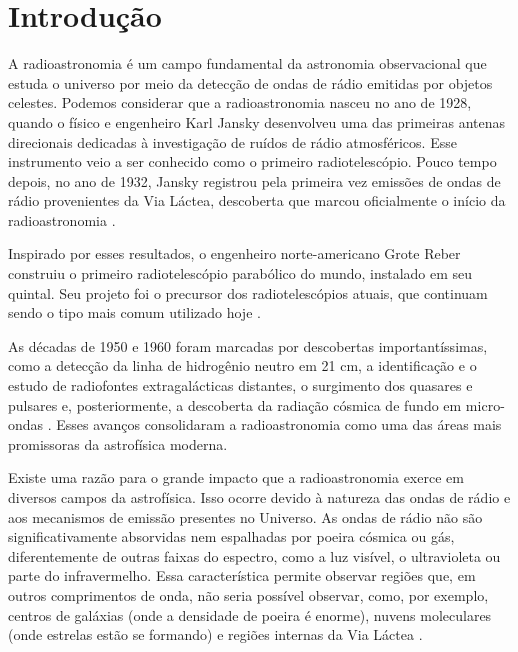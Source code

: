 %
\chapter{Introdução}

A radioastronomia é um campo fundamental da astronomia observacional que estuda o universo por meio da detecção de ondas de rádio emitidas por objetos celestes. Podemos considerar que a radioastronomia nasceu no ano de 1928, quando o físico e engenheiro Karl Jansky desenvolveu uma das primeiras antenas direcionais dedicadas à investigação de ruídos de rádio atmosféricos. Esse instrumento veio a ser conhecido como o primeiro radiotelescópio. Pouco tempo depois, no ano de 1932, Jansky registrou pela primeira vez emissões de ondas de rádio provenientes da Via Láctea, descoberta que marcou oficialmente o início da radioastronomia \cite{cheng2009telescope_Desing, burke2019introduction}.

Inspirado por esses resultados, o engenheiro norte-americano Grote Reber construiu o primeiro radiotelescópio parabólico do mundo, instalado em seu quintal. Seu projeto foi o precursor dos radiotelescópios atuais, que continuam sendo o tipo mais comum utilizado hoje \cite{burke2019introduction,unesp_para_jovens_radioastronomia}.

As décadas de 1950 e 1960 foram marcadas por descobertas importantíssimas, como a detecção da linha de hidrogênio neutro em 21 cm, a identificação e o estudo de radiofontes extragalácticas distantes, o surgimento dos quasares e pulsares e, posteriormente, a descoberta da radiação cósmica de fundo em micro-ondas \cite{burke2019introduction}. Esses avanços consolidaram a radioastronomia como uma das áreas mais promissoras da astrofísica moderna.

Existe uma razão para o grande impacto que a radioastronomia exerce em diversos campos da astrofísica. Isso ocorre devido à natureza das ondas de rádio e aos mecanismos de emissão presentes no Universo. As ondas de rádio não são significativamente absorvidas nem espalhadas por poeira cósmica ou gás, diferentemente de outras faixas do espectro, como a luz visível, o ultravioleta ou parte do infravermelho. Essa característica permite observar regiões que, em outros comprimentos de onda, não seria possível observar, como, por exemplo, centros de galáxias (onde a densidade de poeira é enorme), nuvens moleculares (onde estrelas estão se formando) e regiões internas da Via Láctea \cite{burke2019introduction}.

